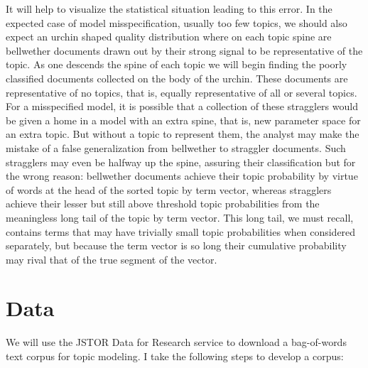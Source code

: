 \documentclass[]{book}
\theoremstyle{definition}
\theoremstyle{definition}
\theoremstyle{definition}
\theoremstyle{remark}
\begin{document}
It will help to visualize the statistical situation leading to this
error. In the expected case of model misspecification, usually too few
topics, we should also expect an urchin shaped quality distribution
where on each topic spine are bellwether documents drawn out by their
strong signal to be representative of the topic. As one descends the
spine of each topic we will begin finding the poorly classified
documents collected on the body of the urchin. These documents are
representative of no topics, that is, equally representative of all or
several topics. For a misspecified model, it is possible that a
collection of these stragglers would be given a home in a model with an
extra spine, that is, new parameter space for an extra topic. But
without a topic to represent them, the analyst may make the mistake of a
false generalization from bellwether to straggler documents. Such
stragglers may even be halfway up the spine, assuring their
classification but for the wrong reason: bellwether documents achieve
their topic probability by virtue of words at the head of the sorted
topic by term vector, whereas stragglers achieve their lesser but still
above threshold topic probabilities from the meaningless long tail of
the topic by term vector. This long tail, we must recall, contains terms
that may have trivially small topic probabilities when considered
separately, but because the term vector is so long their cumulative
probability may rival that of the true segment of the vector.

\hypertarget{data}{%
\section{Data}\label{data}}

We will use the JSTOR Data for Research service to download a
bag-of-words text corpus for topic modeling. I take the following steps
to develop a corpus:
\end{document}
